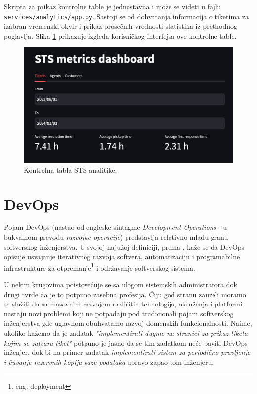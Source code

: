 \documentclass[12pt,oneside]{memoir}
\begin{document}
Skripta za prikaz kontrolne table je jednostavna i može se videti u fajlu \verb|services/analytics/app.py|. Sastoji se od dohvatanja informacija o tiketima za izabran vremenski okvir i prikaz prosečnih vrednosti statistika iz prethodnog poglavlja. Slika \ref{fig:stsmetrics} prikazuje izgleda korisničkog interfejsa ove kontrolne table.

\begin{figure}[h]
  \centering
  \includegraphics[width=1\textwidth]{docs/images/ch_5/stsmetrics.png} 
  \caption{Kontrolna tabla STS analitike.}
  \label{fig:stsmetrics}
\end{figure}


\chapter{DevOps}

Pojam DevOps (nastao od engleske sintagme \textit{Development Operations} - u bukvalnom prevodu \textit{razvojne operacije}) predstavlja relativno mladu granu softverskog inženjerstva. U svojoj najužoj definiciji, prema \cite{zdevopsarticle}, kaže se da DevOps opisuje usvajanje iterativnog razvoja softvera, automatizaciju i programabilne infrastrukture za otpremanje\footnote{eng. deployment} i održavanje softverskog sistema.

U nekim krugovima poistovećuje se sa ulogom sistemskih administratora dok drugi tvrde da je to potpuno zasebna profesija. Čiju god stranu zauzeli moramo se složiti da sa masovnim razvojem različitih tehnologija, okruženja i platformi nastaju novi problemi koji ne potpadaju pod tradicionali pojam softverskog inženjerstva gde uglavnom obuhvatamo razvoj domenskih funkcionalnosti. Naime, ukoliko kažemo da je zadatak \textit{"implementirati dugme na stranici za prikaz tiketa kojim se zatvara tiket"} potpuno je jasno da se tim zadatkom neće baviti DevOps inženjer, dok bi na primer zadatak \textit{implementirati sistem za periodično pravljenje i čuvanje rezervnih kopija baze podataka} upravo zapao tom inženjeru.
\end{document}
